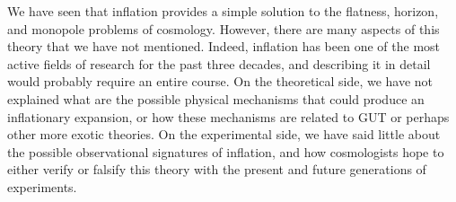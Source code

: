 We have seen that inflation provides a simple solution to the flatness, horizon, and monopole problems of cosmology. However, there are many aspects of this theory that we have not mentioned. Indeed, inflation has been one of the most active fields of research for the past three decades, and describing it in detail would probably require an entire course. On the theoretical side, we have not explained what are the possible physical mechanisms that could produce an inflationary expansion, or how these mechanisms are related to GUT or perhaps other more exotic theories. On the experimental side, we have said little about the possible observational signatures of inflation, and how cosmologists hope to either verify or falsify this theory with the present and future generations of experiments.